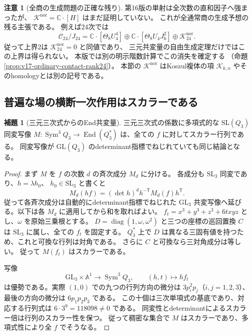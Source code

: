 \documentclass[a4paper,11pt]{ltjsarticle}
\theoremstyle{definition}
\newtheorem{lemma}[theorem]{補題}
\newtheorem{remark}[theorem]{注意}
\begin{document}
\begin{remark}[全商の生成問題の正確な残り]
第16版の単射は全次数の直和因子へ強まったが、
$\mathcal K^{\mathrm{nor}}=\mathbb C\cdot[H]$ はまだ証明していない。
これが全通常商の生成予想の残る主張である。
例えば24次では
\[
 \mathcal C_{24}/J_{24}
 =\mathbb C\cdot[\Theta_8U_4^4]\oplus
   \mathbb C\cdot[\Theta_8U_4J_6^2]\oplus\mathcal K_{24}^{\mathrm{nor}}.
\]
従って上界2は $\mathcal K_{24}^{\mathrm{nor}}=0$ と同値であり、
三元共変量の自由生成定理だけではこの上界は得られない。
本版では別の明示階数計算でこの消失を確定する
（命題\ref{prop:v17-ordinary-contact-rank24}）。
本節の $\mathcal K^{\mathrm{nor}}$ はKoszul複体の項
$\mathcal K_{k,n}$ やそのhomologyとは別の記号である。
\end{remark}

\subsection{普遍な場の横断一次作用はスカラーである}

\begin{lemma}[三元三次式からのEnd共変量]
\label{lem:v17-ternary-endomorphism-scalar}
三元三次式の係数に多項式的な
$\mathrm{SL}(Q_3)$ 同変写像
$M:\operatorname{Sym}^3Q_3\to\operatorname{End}(Q_3^*)$
は、全ての $f$ に対してスカラー行列である。
同変写像が $\mathrm{GL}(Q_3)$ のdeterminant指標でねじれていても同じ結論となる。
\end{lemma}

\begin{proof}
まず $M$ を $f$ の次数 $d$ の斉次成分 $M_d$ に分ける。
各成分も $\mathrm{SL}_3$ 同変であり、$h=\lambda h_0$、
$h_0\in\mathrm{SL}_3$ と書くと
\[
 M_d(hf)=(\det h)^d h^{-\mathsf T}M_d(f)h^{\mathsf T}.
\]
従って各斉次成分は自動的にdeterminant指標でねじれた
$\mathrm{GL}_3$ 共変写像へ延びる。以下は各 $M_d$ に適用してから和を取ればよい。
$f_t=x^3+y^3+z^3+6txyz$ とし、$\omega$ を原始三乗根とする。
$D=\operatorname{diag}(1,\omega,\omega^2)$ と三つの座標の巡回置換 $C$
は $\mathrm{SL}_3$ に属し、全ての $f_t$ を固定する。
$Q_3^*$ 上で $D$ は異なる三固有値を持つため、これと可換な行列は対角である。
さらに $C$ と可換なら三対角成分は等しい。
従って $M(f_t)$ はスカラーである。

写像
\[
 \mathrm{GL}_3\times\mathbb A^1\longrightarrow\operatorname{Sym}^3Q_3,
 \qquad(h,t)\longmapsto hf_t
\]
は優勢である。実際 $(1,0)$ での九つの行列方向の微分は
$3p_i^2p_j$（$i,j=1,2,3$）、最後の方向の微分は $6p_1p_2p_3$ である。
この十個は三次単項式の基底であり、対応する行列式は
$6\cdot3^9=118098\ne0$ である。
同変性とdeterminantによるスカラー倍は行列のスカラー性を保つ。
従って稠密な集合で $M$ はスカラーであり、多項式性により全 $f$ でそうなる。
\end{proof}
\end{document}
